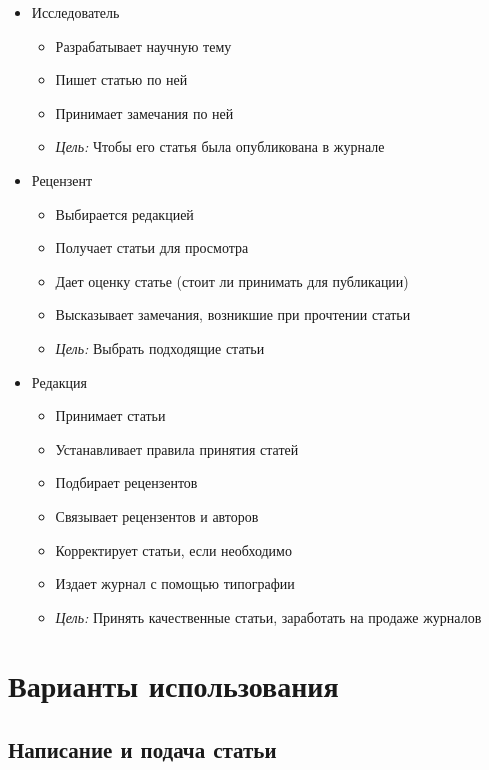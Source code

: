 \begin{itemize}
\item Исследователь

\begin{itemize}
\item Разрабатывает научную тему
\item Пишет статью по ней
\item Принимает замечания по ней
\item \textit{Цель:} Чтобы его статья была опубликована в журнале
\end{itemize}
\item Рецензент

\begin{itemize}
\item Выбирается редакцией
\item Получает статьи для просмотра
\item Дает оценку статье (стоит ли принимать для публикации)
\item Высказывает замечания, возникшие при прочтении статьи
\item \textit{Цель:} Выбрать подходящие статьи
\end{itemize}
\item Редакция

\begin{itemize}
\item Принимает статьи
\item Устанавливает правила принятия статей
\item Подбирает рецензентов
\item Связывает рецензентов и авторов
\item Корректирует статьи, если необходимо
\item Издает журнал с помощью типографии
\item \textit{Цель:} Принять качественные статьи, заработать на продаже журналов
\end{itemize}
\end{itemize}

\section{Варианты использования}

\subsection{Написание и подача статьи}

